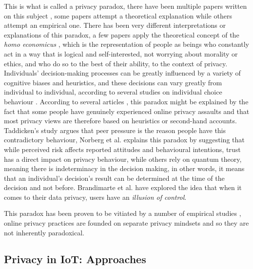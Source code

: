 This is what is called a privacy paradox, there have been multiple papers
written on this subject \cite{solove2021myth, WilliamsPrivacy, lee2021investigating, goad2021privacy, gerber2018explaining},
some papers attempt a theoretical explanation while others attempt an empirical
one. There has been very different interpretations or explanations of this
paradox, a few papers \cite{wilson2012unpacking, warshaw2015can, lee2015privacy}
apply the theoretical concept of the \textit{homo economicus} \cite{zak2008moral},
which is the representation of people as beings who constantly act in a
way that is logical and self-interested, not worrying about morality or
ethics, and who do so to the best of their ability, to the context of privacy.
Individuals' decision-making processes can be greatly influenced by a variety
of cognitive biases and heuristics, and these decisions can vary greatly from
individual to individual, according to several studies on individual choice behaviour \cite{acquisti2007can, knijnenburg2013dimensionality, wakefield2013influence, flender2012type}.
According to several articles \cite{dienlin2015privacy, baek2014solving},
this paradox might be explained by the fact that some people have genuinely
experienced online privacy assaults and that most privacy views are therefore
based on heuristics or second-hand accounts. Taddicken's study \cite{taddicken2014privacy}
argues that peer pressure is the reason people have this contradictory behaviour,
Norberg et al. \cite{norberg2007privacy} explains this paradox by suggesting
that while perceived risk affects reported attitudes and behavioural intentions,
trust has a direct impact on privacy behaviour, while others \cite{flender2012type, kokolakis2017privacy}
rely on quantum theory, meaning there is indeterminacy in the decision making,
in other words, it means that an individual's decision's result can be determined
at the time of the decision and not before. Brandimarte et al. \cite{brandimarte2013misplaced}
have explored the idea that when it comes to their data privacy, users have
an \textit{illusion of control}.

This paradox has been proven to be vitiated by a number of empirical studies \cite{dienlin2015privacy, xie2019consumers, SCHWAIG20131, sannon2018privacy},
online privacy practices are founded on separate privacy mindsets and so
they are not inherently paradoxical.

\subsection{Privacy in IoT: Approaches}

